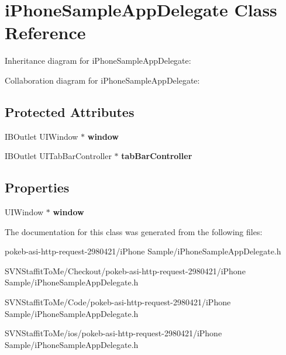 \hypertarget{interfacei_phone_sample_app_delegate}{
\section{i\-Phone\-Sample\-App\-Delegate \-Class \-Reference}
\label{interfacei_phone_sample_app_delegate}
}


\-Inheritance diagram for i\-Phone\-Sample\-App\-Delegate\-:


\-Collaboration diagram for i\-Phone\-Sample\-App\-Delegate\-:
\subsection*{\-Protected \-Attributes}
\begin{DoxyCompactItemize}
\item 
\hypertarget{interfacei_phone_sample_app_delegate_a75b95815f9f2974e641aee2d2eb59232}{
\-I\-B\-Outlet \-U\-I\-Window $\ast$ {\bfseries window}}
\label{interfacei_phone_sample_app_delegate_a75b95815f9f2974e641aee2d2eb59232}

\item 
\hypertarget{interfacei_phone_sample_app_delegate_a6907734a0f04ef26e233759a1a981cf8}{
\-I\-B\-Outlet \-U\-I\-Tab\-Bar\-Controller $\ast$ {\bfseries tab\-Bar\-Controller}}
\label{interfacei_phone_sample_app_delegate_a6907734a0f04ef26e233759a1a981cf8}

\end{DoxyCompactItemize}
\subsection*{\-Properties}
\begin{DoxyCompactItemize}
\item 
\hypertarget{interfacei_phone_sample_app_delegate_ab8e34a3a34a4c0b58426568d4d185dea}{
\-U\-I\-Window $\ast$ {\bfseries window}}
\label{interfacei_phone_sample_app_delegate_ab8e34a3a34a4c0b58426568d4d185dea}

\end{DoxyCompactItemize}


\-The documentation for this class was generated from the following files\-:\begin{DoxyCompactItemize}
\item 
pokeb-\/asi-\/http-\/request-\/2980421/i\-Phone Sample/i\-Phone\-Sample\-App\-Delegate.\-h\item 
\-S\-V\-N\-Staffit\-To\-Me/\-Checkout/pokeb-\/asi-\/http-\/request-\/2980421/i\-Phone Sample/i\-Phone\-Sample\-App\-Delegate.\-h\item 
\-S\-V\-N\-Staffit\-To\-Me/\-Code/pokeb-\/asi-\/http-\/request-\/2980421/i\-Phone Sample/i\-Phone\-Sample\-App\-Delegate.\-h\item 
\-S\-V\-N\-Staffit\-To\-Me/ios/pokeb-\/asi-\/http-\/request-\/2980421/i\-Phone Sample/i\-Phone\-Sample\-App\-Delegate.\-h\end{DoxyCompactItemize}

